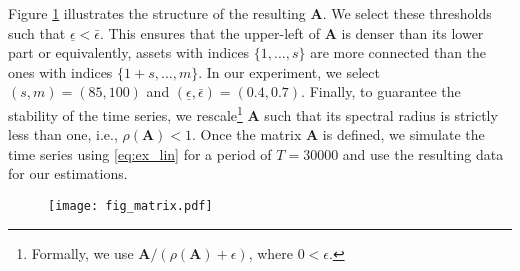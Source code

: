 Figure \ref{fig:matrix} illustrates the structure of the resulting $\textbf{A}$.
We select these thresholds such that $\underline{\epsilon}<\bar{\epsilon}$. 
This ensures that the upper-left of $\textbf{A}$ is denser than its lower part or equivalently, assets with indices $\{1,...,s\}$ are more connected than the ones with indices $\{1+s,...,m\}$.
In our experiment, we select $(s,m)=(85,100)$ and $(\underline{\epsilon},\bar{\epsilon})=(0.4,0.7)$. 
Finally, to guarantee the stability of the time series, we rescale\footnote{Formally, we use $\textbf{A}/(\rho(\textbf{A}) + \epsilon)$, where $0<\epsilon$.} $\textbf{A}$ such that its spectral radius is strictly less than one, i.e.,  $\rho(\textbf{A})< 1$. 
Once the matrix $\textbf{A}$ is defined, we simulate the time series using \eqref{eq:ex_lin} for a period of $T = 30000$ and use the resulting data for our estimations.

\begin{figure}
    \centering
    \texttt{[image: fig\_matrix.pdf]}
    \label{fig:matrix}
\end{figure}

